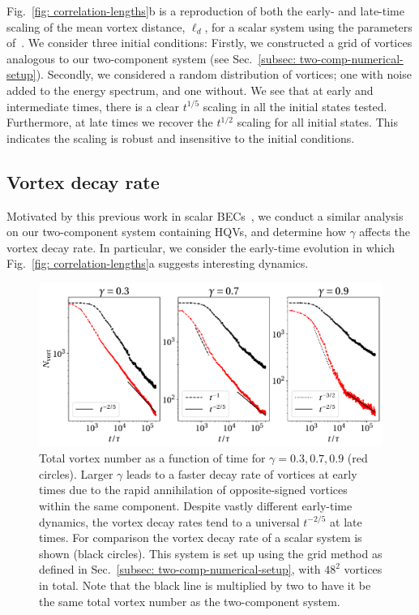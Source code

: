 Fig.~\ref{fig: correlation-lengths}b is a reproduction of both the early- and
late-time scaling of the mean vortex distance, \(\ell_d\), for a scalar system
using the parameters of~\cite{Karl2017}.
We consider three initial conditions: Firstly, we constructed a grid of vortices
analogous to our two-component system (see
Sec.~\ref{subsec: two-comp-numerical-setup}).
Secondly, we considered a random distribution of vortices; one with noise
added to the energy spectrum, and one without.
We see that at early and intermediate times, there is a clear \(t^{1/5}\)
scaling in all the initial states tested.
Furthermore, at late times we recover the \(t^{1/2}\) scaling for all initial
states.
This indicates the scaling is robust and insensitive to the initial conditions.

\subsection{Vortex decay rate}
Motivated by this previous work in scalar BECs~\cite{Karl2017}, we conduct a
similar analysis on our two-component system containing HQVs, and determine how
\(\gamma \) affects the vortex decay rate.
In particular, we consider the early-time evolution in which
Fig.~\ref{fig: correlation-lengths}a suggests interesting dynamics.
\begin{figure}
    \centering
    \includegraphics[width=\textwidth]{gfx/ch-twoCompDynamics/vortex_number.pdf}
    \caption[Vortex decay as a function of time for a system of half-quantum
    vortices for different ratios of inter- to intra-species interaction]
    {\label{fig: vortex-number}Total vortex number as a function of time for
        \(\gamma=0.3,0.7,0.9\) (red circles).
        Larger \(\gamma \) leads to a faster decay rate of vortices at
        early times due to the rapid annihilation of opposite-signed vortices
        within the same component.
        Despite vastly different early-time dynamics, the vortex decay rates
        tend to a universal \(t^{-2/5}\) at late times.
        For comparison the vortex decay rate of a scalar system is shown
        (black circles).
        This system is set up using the grid method as defined in
        Sec.~\ref{subsec: two-comp-numerical-setup}, with \(48^2\) vortices in
        total.
        Note that the black line is multiplied by two to have it be the same
        total vortex number as the two-component system.
    }
\end{figure}
